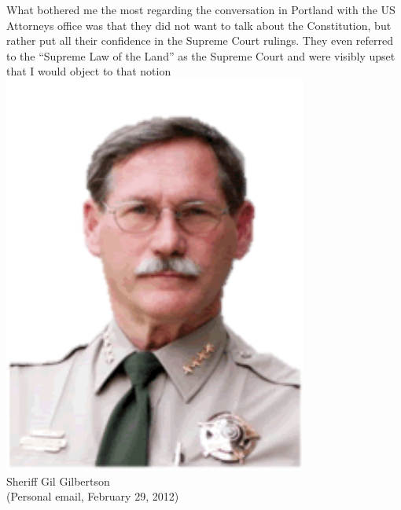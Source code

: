 \begin{frame}
    \begin{columns}[onlytextwidth]
What bothered me the most regarding the conversation in Portland with the US
Attorneys office was that they did not want to talk about the Constitution,
but rather put all their confidence in the Supreme Court rulings. They even
referred to the ``Supreme Law of the Land'' as the Supreme Court and were visibly
upset that I would object to that notion
            \centering
            \includegraphics[width=0.75\textwidth]{img/gil-gilbertson.png}
            \\ Sheriff Gil Gilbertson
            \\ (Personal email, February 29, 2012)
    \end{columns}
\end{frame}

\def\braces#1{[#1]}

